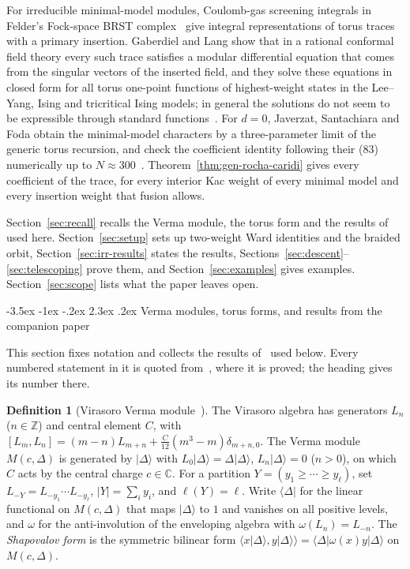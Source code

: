 \documentclass[twoside,10pt]{article}
\makeatletter
\numberwithin{equation}{section}
\theoremstyle{slbody}
\theoremstyle{definition}
\newtheorem{definition}[theorem]{Definition}
\theoremstyle{remark}
\renewcommand{\section}{%
  \@startsection{section}{1}{\z@}%
    {-3.5ex \@plus -1ex \@minus -.2ex}%
    {2.3ex \@plus .2ex}%
    {\normalfont\large\bfseries}}
\makeatother
\begin{document}
For irreducible minimal-model modules, Coulomb-gas screening integrals in
Felder's Fock-space BRST complex~\cite{Felder1989,FelderSilvotti1989} give
integral representations of torus traces with a primary insertion.
Gaberdiel and Lang show that in a rational conformal field theory every such
trace satisfies a modular differential equation that comes from the singular
vectors of the inserted field, and they solve these equations in closed form
for all torus one-point functions of highest-weight states in the Lee--Yang,
Ising and tricritical Ising models; in general the solutions do not seem to
be expressible through standard functions~\cite[\S\S2--4]{GaberdielLang2009}.
For \(d=0\), Javerzat, Santachiara and Foda obtain the minimal-model
characters by a three-parameter limit of the generic torus recursion, and
check the coefficient identity following their (83) numerically up to
\(N\approx300\)~\cite[\S5]{JaverzatSantachiaraFoda2018}.
Theorem~\ref{thm:gen-rocha-caridi} gives every coefficient of the trace, for
every interior Kac weight of every minimal model and every insertion weight
that fusion allows.

Section~\ref{sec:recall} recalls the Verma module, the torus form and the
results of~\cite{PolzerColliding2026} used here.  Section~\ref{sec:setup}
sets up two-weight Ward identities and the braided orbit,
Section~\ref{sec:irr-results} states the results,
Sections~\ref{sec:descent}--\ref{sec:telescoping} prove them, and
Section~\ref{sec:examples} gives examples.  Section~\ref{sec:scope} lists
what the paper leaves open.

\section{Verma modules, torus forms, and results from the companion paper}\label{sec:recall}

This section fixes notation and collects the results of~\cite{PolzerColliding2026}
used below.  Every numbered statement in it is quoted
from~\cite{PolzerColliding2026}, where it is proved; the heading gives its
number there.

\begin{definition}[Virasoro Verma module~{\cite[Definition~2.1]{PolzerColliding2026}}]
The Virasoro algebra has generators \(L_n\) (\(n\in\mathbb Z\)) and central
element \(C\), with
\([L_m,L_n]=(m-n)L_{m+n}+\frac{C}{12}(m^3-m)\delta_{m+n,0}\).
The Verma module \(M(c,\Delta)\) is generated by \(\lvert\Delta\rangle\) with
\(L_0\lvert\Delta\rangle=\Delta\lvert\Delta\rangle\),
\(L_n\lvert\Delta\rangle=0\) (\(n>0\)), on which \(C\) acts by the central
charge \(c\in\mathbb C\).
For a partition \(Y=(y_1\geq\cdots\geq y_\ell)\), set
\(L_{-Y}=L_{-y_1}\cdots L_{-y_\ell}\), \(|Y|=\sum_i y_i\), and
\(\ell(Y)=\ell\).  Write \(\langle\Delta|\) for the linear functional on
\(M(c,\Delta)\) that maps \(\lvert\Delta\rangle\) to \(1\) and vanishes on
all positive levels, and \(\omega\) for the anti-involution of the enveloping
algebra with \(\omega(L_n)=L_{-n}\).  The \emph{Shapovalov form} is the
symmetric bilinear form
\(\langle x\lvert\Delta\rangle,y\lvert\Delta\rangle\rangle
=\langle\Delta|\omega(x)y|\Delta\rangle\) on \(M(c,\Delta)\).
\end{definition}
\end{document}
